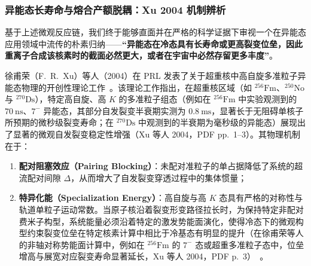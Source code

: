 \subsubsection{异能态长寿命与熔合产额脱耦：Xu 2004 机制辨析}

基于上述微观反应链，我们终于能够直面并在严格的科学证据下审视一个在异能态应用领域中流传的朴素归纳——\textbf{“异能态在冷态具有长寿命或更高裂变位垒，因此重离子合成该核素时的截面必然更大，或者在宇宙中必然存留更多丰度”}。

徐甫荣（F.~R.~Xu）等人（2004）在 PRL 发表了关于超重核中高自旋多准粒子异能态物理的开创性理论工作~\cite{xu-2004-superheavy-high-spin-isomer-stability}。该理论工作指出，在超重核区域（如 $^{256}\mathrm{Fm}$、$^{250}\mathrm{No}$ 与 $^{270}\mathrm{Ds}$），特定高自旋、高 $K$ 的多准粒子组态（例如在 $^{256}\mathrm{Fm}$ 中实验观测到的 $70\ \mathrm{ns}$、$7^-$ 异能态，其部分自发裂变半衰期实测为 $0.8\ \mathrm{ms}$，显著长于无阻碍单核子所预期的微秒级裂变寿命；在 $^{270}\mathrm{Ds}$ 中观测到的半衰期为毫秒级的异能态）展现出了显著的微观自发裂变稳定性增强（Xu 等人 2004，PDF pp.~1--3）。其物理机制在于：
\begin{enumerate}
\item \textbf{配对阻塞效应（Pairing Blocking）}：未配对准粒子的单占据降低了系统的超流配对间隙 $\Delta$，从而增大了自发裂变穿透过程中的集体惯量；
\item \textbf{特异化能（Specialization Energy）}：高自旋与高 $K$ 态具有严格的对称性与轨道单粒子运动常数。当原子核沿着裂变形变路径拉长时，为保持特定非配对费米子构型，系统能量必须沿着特定的激发势能面演化，使得冷态下的微观构型约束裂变位垒在特定核素计算中相比于冷基态有明显的提升（在徐甫荣等人的非轴对称势能面计算中，例如在 $^{256}\mathrm{Fm}$ 的 $7^-$ 态或超重多准粒子态中，位垒增高与展宽对应裂变寿命显著延长，Xu 等人 2004，PDF p.~3）~\cite{xu-2004-superheavy-high-spin-isomer-stability}。
\end{enumerate}

